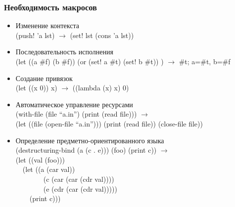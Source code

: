 \documentclass[16pt,pdf,unicode]{beamer}
\begin{document}
\begin{frame}
\frametitle{Необходимость макросов}
\begin{itemize}
\item Изменение контекста\\
  (push! 'a lst) $\rightarrow$ (set! lst (cons 'a lst))
\item Последовательность исполнения\\
  (let ((a \#f) (b \#f))  (or (set! a \#t) (set! b \#t)) ) $\rightarrow$ \#t; a=\#t, b=\#f
\item Создание привязок\\
  (let ((x 0)) x) $\rightarrow$ ((lambda (x) x) 0)
\item Автоматическое управление ресурсами\\
  (with-file (file ``a.in'') (print (read file))) $\rightarrow$\\
  (let ((file (open-file ``a.in''))) (print (read file)) (close-file file))
\item Определение предметно-ориентированного языка\\
  (destructuring-bind (a (c . e))) (foo) (print c)) $\rightarrow$\\
  (let ((val (foo)))\\
  \ \ (let ((a (car val))\\
  \ \ \ \ \ \ \ \ (c (car (car (cdr val))))\\
  \ \ \ \ \ \ \ \ (e (cdr (car (cdr val)))))\\
  \ \ \ \ (print c)))
\end{itemize}
\end{frame}

\end{document}
